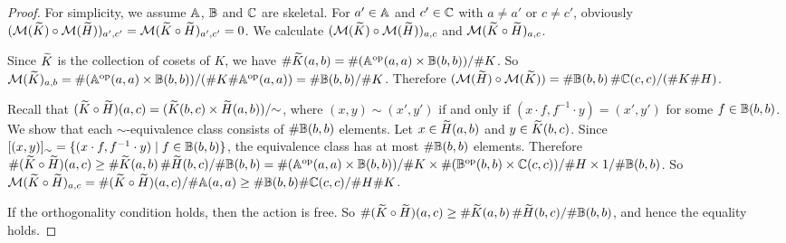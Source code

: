 \begin{proof}
    For simplicity, we assume \( \mathbb{A} \), \( \mathbb{B} \) and \( \mathbb{C} \) are skeletal.
    For \( a' \in \mathbb{A} \) and \( c' \in \mathbb{C} \) with \( a \neq a' \) or \( c \neq c' \), obviously \( (\mathcal{M}({\widetilde{K}}) \circ \mathcal{M}({\widetilde{H}}))_{a',c'} = \mathcal{M}({\widetilde{K} \circ \widetilde{H}})_{a',c'} = 0 \).
    We calculate \( (\mathcal{M}({\widetilde{K}}) \circ \mathcal{M}({\widetilde{H}}))_{a,c} \) and \( \mathcal{M}({\widetilde{K} \circ \widetilde{H}})_{a,c} \).

    Since \( \widetilde{K} \) is the collection of cosets of \( K \), we have \( \#\widetilde{K}(a,b) = \#(\mathbb{A}^{\mathrm{op}}(a,a) \times \mathbb{B}(b,b))/\#K \).
    So \( \mathcal{M}({\widetilde{K}})_{a,b} = \#(\mathbb{A}^{\mathrm{op}}(a,a) \times \mathbb{B}(b,b))/(\#K \#\mathbb{A}^{\mathrm{op}}(a,a)) = \#\mathbb{B}(b,b)/\#K \).
    Therefore \( (\mathcal{M}({\widetilde{H}}) \circ \mathcal{M}({\widetilde{K}})) = \#\mathbb{B}(b,b)\,\#\mathbb{C}(c,c)/(\#K \#H) \).

    Recall that \( (\widetilde{K} \circ \widetilde{H})(a,c) = (\widetilde{K}(b, c) \times \widetilde{H}(a,b))/{\sim} \), where \( (x, y) \sim (x', y') \) if and only if \( (x \cdot f, f^{-1} \cdot y) = (x', y') \) for some \( f \in \mathbb{B}(b,b) \).
    We show that each \( \sim \)-equivalence class consists of \( \#\mathbb{B}(b,b) \) elements.
    Let \( x \in \widetilde{H}(a,b) \) and \( y \in \widetilde{K}(b,c) \).
    Since \( [(x,y)]_{\sim} = \{ (x \cdot f, f^{-1} \cdot y) \mid f \in \mathbb{B}(b,b) \} \), the equivalence class has at most \( \# \mathbb{B}(b,b) \) elements.
    Therefore \( \#(\widetilde{K} \circ \widetilde{H})(a,c) \ge \#\widetilde{K}(a,b) \,\#\widetilde{H}(b,c) / \#\mathbb{B}(b,b) = \#(\mathbb{A}^{\mathrm{op}}(a,a) \times \mathbb{B}(b,b))/\#K \times \#(\mathbb{B}^{\mathrm{op}}(b,b) \times \mathbb{C}(c,c))/\#H \times 1/\#\mathbb{B}(b,b) \).
    So \( \mathcal{M}({\widetilde{K} \circ \widetilde{H}})_{a,c} = \#(\widetilde{K} \circ \widetilde{H})(a,c)/\#\mathbb{A}(a,a) \ge \#\mathbb{B}(b,b) \# \mathbb{C}(c,c) / \#H \#K \).

    If the orthogonality condition holds, then the action is free.
    So \( \#(\widetilde{K} \circ \widetilde{H})(a,c) \ge \#\widetilde{K}(a,b) \,\#\widetilde{H}(b,c) / \#\mathbb{B}(b,b) \), and hence the equality holds.


\end{proof}
